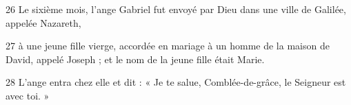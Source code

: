 26 Le sixième mois, l’ange Gabriel fut envoyé par Dieu dans une ville de Galilée, appelée Nazareth,

27 à une jeune fille vierge, accordée en mariage à un homme de la maison de David, appelé Joseph ; et le nom de la jeune fille était Marie.

28 L’ange entra chez elle et dit : « Je te salue, Comblée-de-grâce, le Seigneur est avec toi. »
